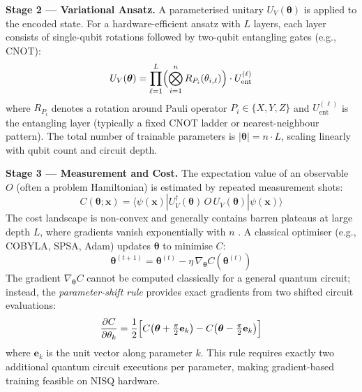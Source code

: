 \textbf{Stage 2 --- Variational Ansatz.} A parameterised unitary $U_V(\boldsymbol{\theta})$ is applied to the encoded state. For a hardware-efficient ansatz with $L$ layers, each layer consists of single-qubit rotations followed by two-qubit entangling gates (e.g., CNOT):
\begin{equation}
    U_V(\boldsymbol{\theta}) = \prod_{\ell=1}^{L} \Bigl( \bigotimes_{i=1}^{n} R_{P_i}(\theta_{i,\ell}) \Bigr) \cdot U_{\text{ent}}^{(\ell)}
    \label{eq:variational_ansatz}
\end{equation}
where $R_{P_i}$ denotes a rotation around Pauli operator $P_i \in \{X,Y,Z\}$ and $U_{\text{ent}}^{(\ell)}$ is the entangling layer (typically a fixed CNOT ladder or nearest-neighbour pattern). The total number of trainable parameters is $|\boldsymbol{\theta}| = n \cdot L$, scaling linearly with qubit count and circuit depth.

\textbf{Stage 3 --- Measurement and Cost.} The expectation value of an observable $O$ (often a problem Hamiltonian) is estimated by repeated measurement shots:
\begin{equation}
    C(\boldsymbol{\theta}; \mathbf{x}) = \langle \psi(\mathbf{x}) | U_V^{\dagger}(\boldsymbol{\theta}) \, O \, U_V(\boldsymbol{\theta}) | \psi(\mathbf{x}) \rangle
    \label{eq:vqc_cost}
\end{equation}
The cost landscape is non-convex and generally contains barren plateaus at large depth $L$, where gradients vanish exponentially with $n$ \cite{Blekos2024}. A classical optimiser (e.g., COBYLA, SPSA, Adam) updates $\boldsymbol{\theta}$ to minimise $C$:
\begin{equation}
    \boldsymbol{\theta}^{(t+1)} = \boldsymbol{\theta}^{(t)} - \eta \, \nabla_{\boldsymbol{\theta}} C(\boldsymbol{\theta}^{(t)})
    \label{eq:classical_update}
\end{equation}
The gradient $\nabla_{\boldsymbol{\theta}} C$ cannot be computed classically for a general quantum circuit; instead, the \emph{parameter-shift rule} provides exact gradients from two shifted circuit evaluations:
\begin{equation}
    \frac{\partial C}{\partial \theta_k} = \frac{1}{2}\Bigl[ C\bigl(\boldsymbol{\theta} + \tfrac{\pi}{2}\mathbf{e}_k\bigr) - C\bigl(\boldsymbol{\theta} - \tfrac{\pi}{2}\mathbf{e}_k\bigr) \Bigr]
    \label{eq:parameter_shift}
\end{equation}
where $\mathbf{e}_k$ is the unit vector along parameter $k$. This rule requires exactly two additional quantum circuit executions per parameter, making gradient-based training feasible on NISQ hardware.

